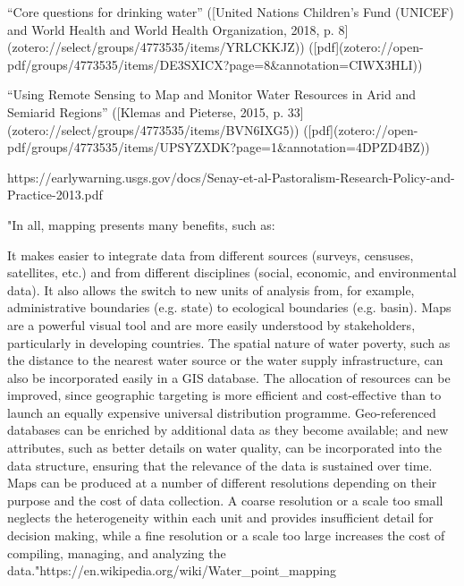 {“Core questions for drinking water” ([United Nations Children’s Fund (UNICEF) and World Health and World Health Organization, 2018, p. 8](zotero://select/groups/4773535/items/YRLCKKJZ)) ([pdf](zotero://open-pdf/groups/4773535/items/DE3SXICX?page=8&annotation=CIWX3HLI))

“Using Remote Sensing to Map and Monitor Water Resources in Arid and Semiarid Regions” ([Klemas and Pieterse, 2015, p. 33](zotero://select/groups/4773535/items/BVN6IXG5)) ([pdf](zotero://open-pdf/groups/4773535/items/UPSYZXDK?page=1&annotation=4DPZD4BZ))

https://earlywarning.usgs.gov/docs/Senay-et-al-Pastoralism-Research-Policy-and-Practice-2013.pdf


"In all, mapping presents many benefits, such as:

It makes easier to integrate data from different sources (surveys, censuses, satellites, etc.) and from different disciplines (social, economic, and environmental data). It also allows the switch to new units of analysis from, for example, administrative boundaries (e.g. state) to ecological boundaries (e.g. basin).
Maps are a powerful visual tool and are more easily understood by stakeholders, particularly in developing countries.
The spatial nature of water poverty, such as the distance to the nearest water source or the water supply infrastructure, can also be incorporated easily in a GIS database.
The allocation of resources can be improved, since geographic targeting is more efficient and cost-effective than to launch an equally expensive universal distribution programme.
Geo-referenced databases can be enriched by additional data as they become available; and new attributes, such as better details on water quality, can be incorporated into the data structure, ensuring that the relevance of the data is sustained over time.
Maps can be produced at a number of different resolutions depending on their purpose and the cost of data collection. A coarse resolution or a scale too small neglects the heterogeneity within each unit and provides insufficient detail for decision making, while a fine resolution or a scale too large increases the cost of compiling, managing, and analyzing the data."https://en.wikipedia.org/wiki/Water_point_mapping

}
